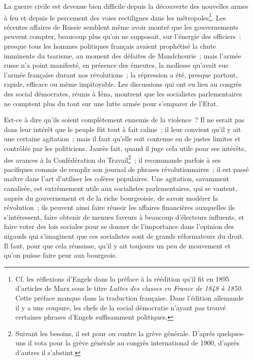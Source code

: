 \documentclass[french,twoside]{book} %
\begin{document}
La guerre civile est devenue bien difficile depuis la découverte des nouvelles armes à feu et depuis le percement des voies rectilignes dans les métropoles\footnote{ \noindent Cf. les réflexions d’Engels dans la préface à la réédition qu’il fit en 1895 d’articles de Marx sous le titre \emph{Luttes des classes en France de 1848 à 1850}. Cette préface manque dans la traduction française. Dans l’édition allemande il y a une coupure, les chefs de la social démocratie n’ayant pas trouvé certaines phrases d’Engels suffisamment politiques.
 }. Les  récentes affaires de Russie semblent même avoir montré que les gouvernements peuvent compter, beaucoup plus qu’on ne supposait, sur l’énergie des officiers : presque tous les hommes politiques français avaient prophétisé la chute imminente du tsarisme, au moment des défaites de Mandchourie ; mais l’armée russe n’a point manifesté, en présence des émeutes, la mollesse qu’avait eue l’armée française durant nos révolutions ; la répression a été, presque partout, rapide, efficace ou même impitoyable. Les discussions qui ont eu lieu au congrès des social démocrates, réunis à Iéna, montrent que les socialistes parlementaires ne comptent plus du tout sur une lutte armée pour s’emparer de l’Etat.\par
Est-ce à dire qu’ils soient complètement ennemis de la violence ? Il ne serait pas dans leur intérêt que le peuple fût tout à fait calme ; il leur convient qu’il y ait une certaine agitation ; mais il faut qu’elle soit contenue en de justes limites et contrôlée par les politiciens. Jaurès fait, quand il juge cela utile pour ses intérêts, des avances à la Confédération du Travail\footnote{ \noindent Suivant les besoins, il est pour ou contre la grève générale. D’après quelques-uns il vota pour la grève générale au congrès international de 1900, d’après d’autres il s’abstint.
 } ; il recommande parfois à ses pacifiques commis de remplir son journal de phrases révolutionnaires ; il est passé maître dans l’art d’utiliser les colères populaires. Une agitation, savamment canalisée, est extrêmement utile aux socialistes parlementaires, qui se vantent, auprès du gouvernement et de la riche bourgeoisie, de savoir modérer la révolution ; ils peuvent ainsi faire réussir les affaires financières auxquelles ils  s’intéressent, faire obtenir de menues faveurs à beaucoup d’électeurs influents, et faire voter des lois sociales pour se donner de l’importance dans l’opinion des nigauds qui s’imaginent que ces socialistes sont de grands réformateurs du droit. Il faut, pour que cela réussisse, qu’il y ait toujours un peu de mouvement et qu’on puisse faire peur aux bourgeois.\par
\end{document}

